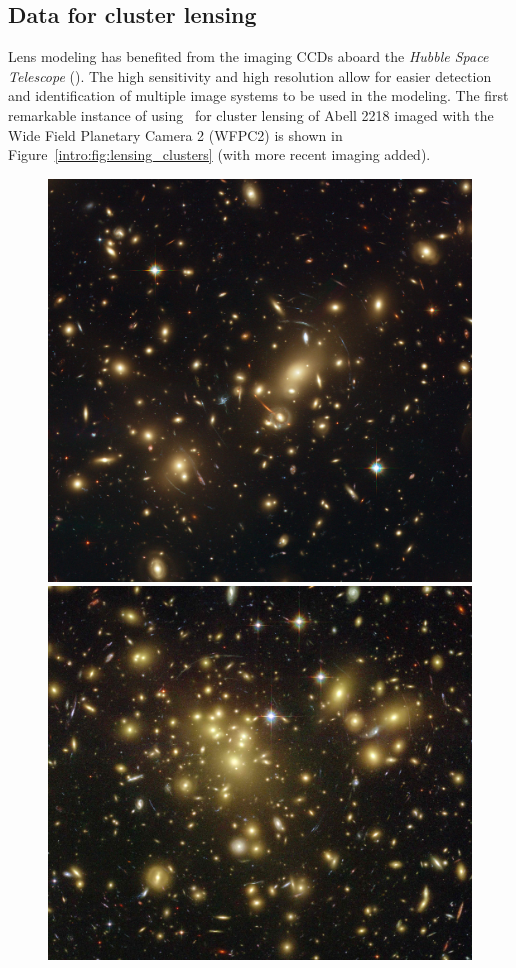\subsection{Data for cluster lensing}

Lens modeling has benefited from the imaging CCDs aboard the {\it Hubble Space Telescope} (\hst). The high sensitivity and high resolution allow for easier detection and identification of multiple image systems to be used in the modeling. The first remarkable instance of using \hst\ for cluster lensing of Abell 2218 \citep{Kneib:1996kb} imaged with the Wide Field Planetary Camera 2 (WFPC2) is shown in Figure~\ref{intro:fig:lensing_clusters} (with more recent imaging added). 

\begin{figure}
\centering
\includegraphics[height=0.3\textheight]{Intro/a2218.jpg}
\includegraphics[height=0.3\textheight]{Intro/a1689.jpg}

\end{figure}
